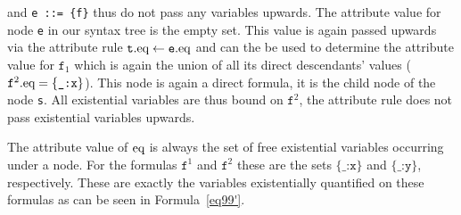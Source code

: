 and \texttt{e ::= \{f\}} thus do  not pass any variables upwards. 
The attribute value for node \texttt{e} in our syntax tree is the empty set.
This value is again passed upwards via the attribute rule $\texttt{t}.\text{eq}\leftarrow \texttt{e}.\text{eq}$ %
and can the be used to determine the attribute value for $\texttt{f}_1$
which is again the union of all its direct descendants' 
values ($\texttt{f}^2.\text{eq} = \{\texttt{\_:x}\}$).
This node is again a direct formula, it is the child node of the node \texttt{s}. All existential variables are thus bound on $\texttt{f}^2$, the attribute rule does not pass
existential variables upwards. %

The attribute value of $\text{eq}$ is always the set of free existential variables occurring under a node. For the formulas $\texttt{f}^1$ 
and $\texttt{f}^2$ these are the sets $\texttt{\{\_:x\}}$ and $\texttt{\{\_:y\}}$, respectively. These are exactly the variables existentially quantified on these formulas as can be seen in 
Formula~\ref{eq99'}.

